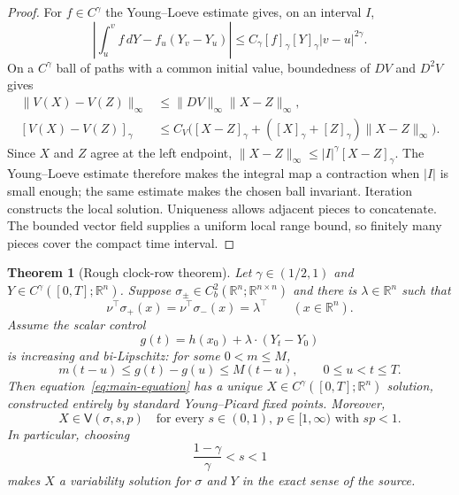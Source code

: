 \documentclass[11pt]{article}
\newtheorem{theorem}{Theorem}
\newcommand{\R}{\mathbb{R}}
\newcommand{\V}{\mathsf{V}}
\begin{document}
\begin{proof}
For $f\in C^\gamma$ the Young--Loeve estimate gives, on an interval $I$,
\[
 \left|\int_u^v f\,dY-f_u(Y_v-Y_u)\right|
 \leq C_\gamma[f]_\gamma[Y]_\gamma|v-u|^{2\gamma}.
\]
On a $C^\gamma$ ball of paths with a common initial value, boundedness of
$DV$ and $D^2V$ gives
\begin{align*}
 \|V(X)-V(Z)\|_\infty&\leq \|DV\|_\infty\|X-Z\|_\infty,\\
 [V(X)-V(Z)]_\gamma
 &\leq C_V\bigl([X-Z]_\gamma+
 ([X]_\gamma+[Z]_\gamma)\|X-Z\|_\infty\bigr).
\end{align*}
Since $X$ and $Z$ agree at the left endpoint,
$\|X-Z\|_\infty\leq |I|^\gamma[X-Z]_\gamma$.  The Young--Loeve estimate
therefore makes the integral map a contraction when $|I|$ is small enough;
the same estimate makes the chosen ball invariant.  Iteration constructs the
local solution.  Uniqueness allows adjacent pieces to concatenate.  The
bounded vector field supplies a uniform local range bound, so finitely many
pieces cover the compact time interval.
\end{proof}

\begin{theorem}[Rough clock-row theorem]\label{thm:rough}
Let $\gamma\in(1/2,1)$ and $Y\in C^\gamma([0,T];\R^n)$.  Suppose
$\sigma_\pm\in C_b^2(\R^n;\R^{n\times n})$ and there is
$\lambda\in\R^n$ such that
\begin{equation}\label{eq:common-row}
 \nu^\top\sigma_+(x)=\nu^\top\sigma_-(x)=\lambda^\top
 \qquad(x\in\R^n).
\end{equation}
Assume the scalar control
\begin{equation}\label{eq:g-def}
 g(t)=h(x_0)+\lambda\cdot(Y_t-Y_0)
\end{equation}
is increasing and bi-Lipschitz: for some $0<m\leq M$,
\begin{equation}\label{eq:bilip-clock}
 m(t-u)\leq g(t)-g(u)\leq M(t-u),\qquad 0\leq u<t\leq T.
\end{equation}
Then equation~\eqref{eq:main-equation} has a unique
$X\in C^\gamma([0,T];\R^n)$ solution, constructed entirely by standard
Young--Picard fixed points.  Moreover,
\begin{equation}\label{eq:sp-conclusion}
 X\in\V(\sigma,s,p)
 \quad\text{for every }s\in(0,1),\ p\in[1,\infty)
 \text{ with }sp<1.
\end{equation}
In particular, choosing
\[
 \frac{1-\gamma}{\gamma}<s<1
\]
makes $X$ a variability solution for $\sigma$ and $Y$ in the exact sense of
the source.
\end{theorem}
\end{document}
